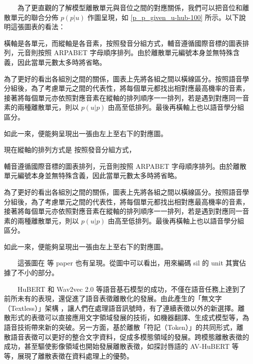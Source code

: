 {
{

　　為了更直觀的了解模型離散單元與音位之間的對應關係，我們可以把音位和離散單元的聯合分佈 \(p(p|u)\) 作圖呈現，如 \ref{p_p_given_u-hub-100} 所示。以下說明這張圖表的看法：

        橫軸是各單元，而縱軸是各音素，按照發音分組方式，輔音遵循國際音標的圖表排列，元音則按照 ARPABET  字母順序排列。由於離散單元編號本身並無特殊含義，因此當單元數太多時將省略。

        為了更好的看出各組別之間的關係，圖表上先將各組之間以橫線區分。按照語音學分組後，為了考慮單元之間的代表性，將每個單元都找出相對應最高機率的音素，接著將每個單元亦依照對應音素在縱軸的排列順序一一排列，若是遇到對應同一音素的兩種離散單元，則以 \(p(u|p) \) 由高至低排列。最後再橫軸上也以語音學分組區分。

        如此一來，便能夠呈現出一張由左上至右下的對應圖。

}
{



現在縱軸的排列方式是
             按照發音分組方式，

             
             輔音遵循國際音標的圖表排列，元音則按照 ARPABET  字母順序排列。由於離散單元編號本身並無特殊含義，因此當單元數太多時將省略。

        為了更好的看出各組別之間的關係，圖表上先將各組之間以橫線區分。按照語音學分組後，為了考慮單元之間的代表性，將每個單元都找出相對應最高機率的音素，接著將每個單元亦依照對應音素在縱軸的排列順序一一排列，若是遇到對應同一音素的兩種離散單元，則以 \(p(u|p) \) 由高至低排列。最後再橫軸上也以語音學分組區分。

        如此一來，便能夠呈現出一張由左上至右下的對應圖。




　　這張圖在 等 paper 也有呈現。從圖中可以看出，用來編碼 sil 的 unit 其實佔據了不小的部分。


}
  {  %

　　HuBERT \cite{hsu_hubert_2021, hsu_hubert_2021-2} 和 Wav2vec 2.0 \cite{baevski2020wav2vec} 等語音基石模型的成功，不僅在語音任務上達到了前所未有的表現，還促進了語音表徵離散化的發展。由此產生的「無文字（Textless）」架構 \cite{noauthor_textless_2021, lakhotia_generative_2021, lakhotia_generative_2021-1}，讓人們在處理語音訊號時，有了連續表徵以外的新選擇。離散形式的表徵可以直接應用文字領域發展的技術，如機器翻譯、生成式模型等，為語音技術帶來新的突破。另一方面，基於離散「符記（Token）」的共同形式，離散語音表徵可以更好的整合文字資料，促成多模態領域的發展。跨模態離散表徵的成功，甚至驅使影像領域也開始發展離散表徵，\jeffcomment{\textcolor{yellow}{(要確認一下「開始」嗎？)}}如探討唇語的 AV-HuBERT \cite{shi2021learning} 等等，展現了離散表徵在資料處理上的優勢。

}}
